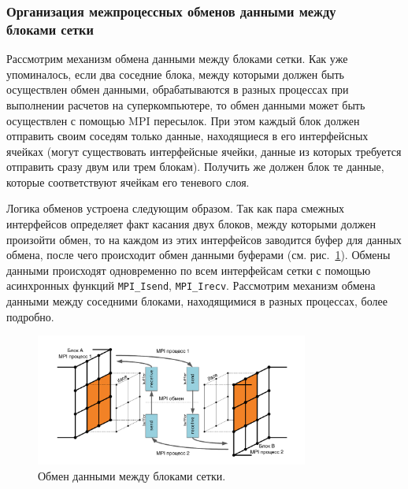 \subsubsection{Организация межпроцессных обменов данными между \\ блоками сетки}

Рассмотрим механизм обмена данными между блоками сетки.
Как уже упоминалось, если два соседние блока, между которыми должен быть осуществлен обмен данными, обрабатываются в разных процессах при выполнении расчетов на суперкомпьютере, то обмен данными может быть осуществлен с помощью MPI\label{abbr:mpi2} пересылок.
При этом каждый блок должен отправить своим соседям только данные, находящиеся в его интерфейсных ячейках (могут существовать интерфейсные ячейки, данные из которых требуется отправить сразу двум или трем блокам).
Получить же должен блок те данные, которые соответствуют ячейкам его теневого слоя.

Логика обменов устроена следующим образом.
Так как пара смежных интерфейсов определяет факт касания двух блоков, между которыми должен произойти обмен, то на каждом из этих интерфейсов заводится буфер для данных обмена, после чего происходит обмен данными буферами (см. рис.~\ref{fig:text_2_block_data_exchange}).
Обмены данными происходят одновременно по всем интерфейсам сетки с помощью асинхронных функций
\texttt{MPI\_Isend}, \texttt{MPI\_Irecv}.
Рассмотрим механизм обмена данными между соседними блоками, находящимися в разных процессах, более подробно.

\begin{figure}[ht]
\centering
\includegraphics[width=0.8\textwidth]{./pics/text_2_block/10-data-exchange.pdf}
\singlespacing
{}\caption{Обмен данными между блоками сетки.}
\label{fig:text_2_block_data_exchange}
\end{figure}

